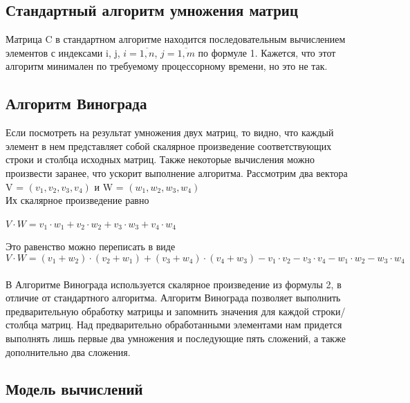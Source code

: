 \documentclass[a4paper, 14pt]{article}
\begin{document}
		\subsection{Стандартный алгоритм умножения матриц}
		
		Матрица C в стандартном алгоритме находится последовательным вычислением элементов с индексами i, j, $i = \overline{1,n}$, $j = \overline{1,m}$ по формуле 1. Кажется, что этот алгоритм минимален по требуемому процессорному времени, но это не так.
		
		\subsection{Алгоритм Винограда}
		
		Если посмотреть на результат умножения двух матриц, то видно,
		что каждый элемент в нем представляет собой скалярное произведение
		соответствующих строки и столбца исходных матриц. Также некоторые вычисления можно произвести заранее, что ускорит выполнение алгоритма.
		Рассмотрим два вектора V = $(v_{1}, v_{2}, v_{3}, v_{4})$ и W = $(w_{1}, w_{2}, w_{3}, w_{4})$\\
		    Их скалярное произведение равно\\
		    \begin{center}
$ V \cdot W=v_1 \cdot w_1 + v_2 \cdot w_2 + v_3 \cdot w_3 + v_4 \cdot w_4$ \\
		    \end{center}
         Это равенство можно переписать в виде\\
         \begin{equation}
V \cdot W=(v_1 + w_2) \cdot (v_2 + w_1) + (v_3 + w_4) \cdot (v_4 + w_3) - v_1 \cdot v_2 - v_3 \cdot v_4 - w_1 \cdot w_2 - w_3 \cdot w_4
         \end{equation}\\
        В Алгоритме Винограда используется скалярное произведение из формулы 2, в отличие от стандартного алгоритма. Алгоритм Винограда позволяет выполнить предварительную обработку матрицы и запомнить значения для каждой строки/столбца матриц.
Над предварительно обработанными элементами нам придется выполнять лишь первые два умножения и последующие пять сложений, а также
дополнительно два сложения.\\
		
		\subsection{Модель вычислений}
		
\end{document}
